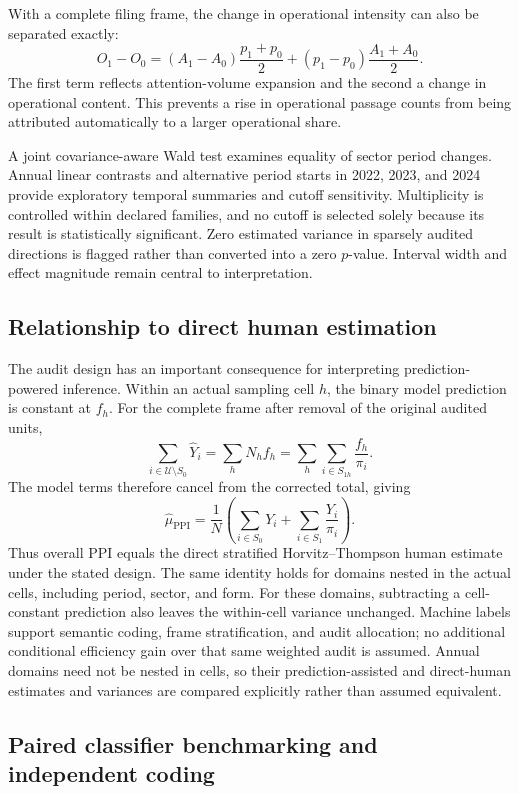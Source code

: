 \documentclass[12pt]{article}
\begin{document}
With a complete filing frame, the change in operational intensity can also
be separated exactly:
\[
 O_1-O_0=(A_1-A_0)\frac{p_1+p_0}{2}
          +(p_1-p_0)\frac{A_1+A_0}{2}.
\]
The first term reflects attention-volume expansion and the second a change
in operational content. This prevents a rise in operational passage counts
from being attributed automatically to a larger operational share.

A joint covariance-aware Wald test examines equality of sector period changes.
Annual linear contrasts and alternative period starts in 2022, 2023, and 2024
provide exploratory temporal summaries and cutoff sensitivity. Multiplicity
is controlled within declared families, and no cutoff is selected solely
because its result is statistically significant. Zero estimated variance in
sparsely audited directions is flagged rather than converted into a zero
$p$-value. Interval width and effect magnitude remain central to interpretation.

\subsection{Relationship to direct human estimation}

The audit design has an important consequence for interpreting prediction-
powered inference. Within an actual sampling cell $h$, the binary model
prediction is constant at $f_h$. For the complete frame after removal of the
original audited units,
\[
 \sum_{i\in\mathcal U\setminus S_0}\widehat Y_i
 =\sum_h N_hf_h
 =\sum_h\sum_{i\in S_{1h}}\frac{f_h}{\pi_i}.
\]
The model terms therefore cancel from the corrected total, giving
\[
 \widehat\mu_{\mathrm{PPI}}
 =\frac{1}{N}\left(\sum_{i\in S_0}Y_i
          +\sum_{i\in S_1}\frac{Y_i}{\pi_i}\right).
\]
Thus overall PPI equals the direct stratified Horvitz--Thompson human estimate
under the stated design. The same identity holds for domains nested in the
actual cells, including period, sector, and form. For these domains, subtracting
a cell-constant prediction also leaves the within-cell variance unchanged.
Machine labels support semantic coding, frame stratification, and audit
allocation; no additional conditional efficiency gain over that same weighted
audit is assumed. Annual domains need not be nested in cells, so their
prediction-assisted and direct-human estimates and variances are compared
explicitly rather than assumed equivalent.

\subsection{Paired classifier benchmarking and independent coding}
\end{document}
